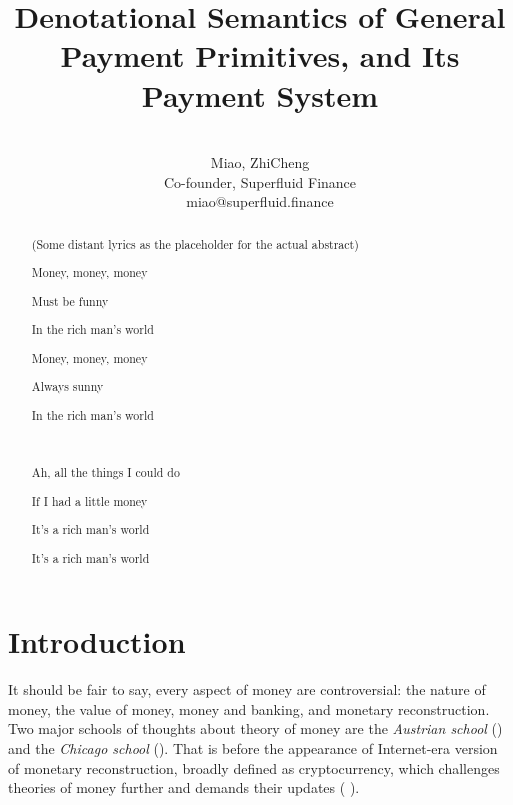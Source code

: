 


\title{Denotational Semantics of General Payment Primitives, and Its Payment System}

\author{\\
    Miao, ZhiCheng\\
    Co-founder, Superfluid Finance\\
    miao@superfluid.finance
}


\maketitle

\begin{abstract}
    \begin{center}
        (Some distant lyrics as the placeholder for the actual abstract)

        Money, money, money

        Must be funny

        In the rich man's world

        Money, money, money

        Always sunny

        In the rich man's world

        \

        Ah, all the things I could do

        If I had a little money

        It's a rich man's world

        It's a rich man's world
    \end{center}
\end{abstract}

\chapter{Introduction}

It should be fair to say, every aspect of money are controversial: the nature of money, the value of money, money and
banking, and monetary reconstruction. Two major schools of thoughts about theory of money are the \textit{Austrian
    school} (\cite{von2013theory}) and the \textit{Chicago school} (\cite{friedman1989quantity}). That is before the
appearance of Internet-era version of monetary reconstruction, broadly defined as cryptocurrency, which challenges
theories of money further and demands their updates (\cite{ammous2018can} \cite{hardle2020understanding}).

